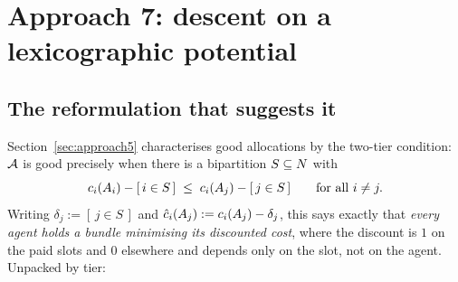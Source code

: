 
\section{Approach 7: descent on a lexicographic potential}
\label{sec:approach7}

\subsection{The reformulation that suggests it}

Section~\ref{sec:approach5} characterises good allocations by the two-tier
condition: $\mathcal{A}$ is good precisely when there is a bipartition
$S \subseteq N$ with
\[
  c_i(A_{i}) - [\,i \in S\,]
  \;\le\;
  c_i(A_{j}) - [\,j \in S\,]
  \qquad \text{for all } i \ne j .
\]
Writing $\delta_j := [\,j \in S\,]$ and
$\hat{c}_i(A_{j}) := c_i(A_{j}) - \delta_j$, this says exactly
that \emph{every agent holds
a bundle minimising its discounted cost}, where the discount is $1$ on the paid
slots and $0$ elsewhere and depends only on the slot, not on the agent. Unpacked
by tier:

